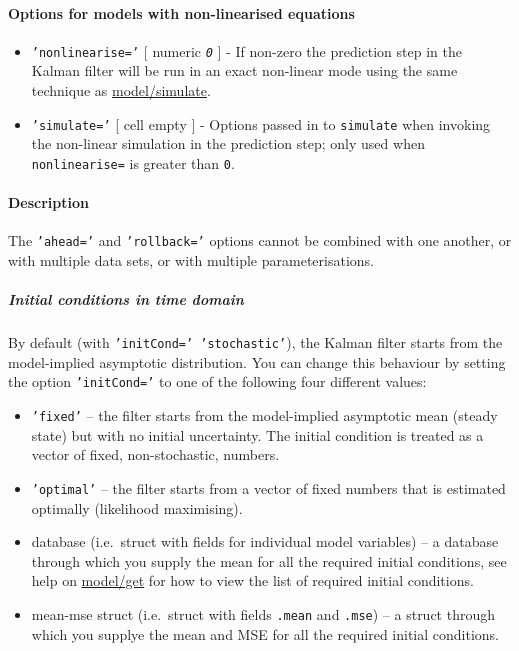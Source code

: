  \paragraph{Options for models with non-linearised equations}
 
 \begin{itemize}
 \item
   \texttt{'nonlinearise='} {[} numeric \textbar{} \emph{\texttt{0}} {]}
   - If non-zero the prediction step in the Kalman filter will be run in
   an exact non-linear mode using the same technique as
   \url{model/simulate}.
 \item
   \texttt{'simulate='} {[} cell \textbar{} empty {]} - Options passed in
   to \texttt{simulate} when invoking the non-linear simulation in the
   prediction step; only used when \texttt{nonlinearise=} is greater than
   \texttt{0}.
 \end{itemize}
 
 \paragraph{Description}
 
 The \texttt{'ahead='} and \texttt{'rollback='} options cannot be
 combined with one another, or with multiple data sets, or with multiple
 parameterisations.
 
 \subparagraph{Initial conditions in time domain}
 
 By default (with \texttt{'initCond=' 'stochastic'}), the Kalman filter
 starts from the model-implied asymptotic distribution. You can change
 this behaviour by setting the option \texttt{'initCond='} to one of the
 following four different values:
 
 \begin{itemize}
 \item
   \texttt{'fixed'} -- the filter starts from the model-implied
   asymptotic mean (steady state) but with no initial uncertainty. The
   initial condition is treated as a vector of fixed, non-stochastic,
   numbers.
 \item
   \texttt{'optimal'} -- the filter starts from a vector of fixed numbers
   that is estimated optimally (likelihood maximising).
 \item
   database (i.e.~struct with fields for individual model variables) -- a
   database through which you supply the mean for all the required
   initial conditions, see help on \url{model/get} for how to view the
   list of required initial conditions.
 \item
   mean-mse struct (i.e.~struct with fields \texttt{.mean} and
   \texttt{.mse}) -- a struct through which you supplye the mean and MSE
   for all the required initial conditions.
 \end{itemize}
 
